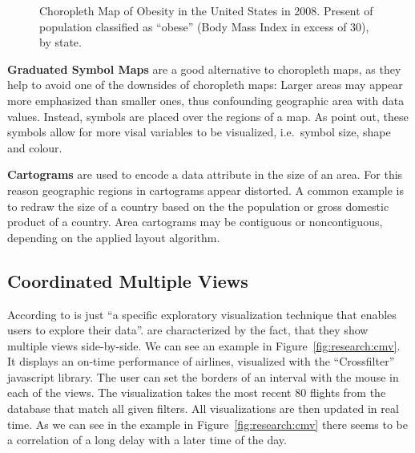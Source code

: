 \begin{figure}[ht]
  \centering
  \caption{%
    Choropleth Map of Obesity in the United States in 2008.
    Present of population classified as ``obese'' (Body Mass Index in excess of 30), by state.
  }\label{fig:related-work:choropleth}
\end{figure}

\textbf{Graduated Symbol Maps} are a good alternative to choropleth maps, as they help to avoid one of the downsides of choropleth maps:
Larger areas may appear more emphasized than smaller ones, thus confounding geographic area with data values.
Instead, symbols are placed over the regions of a map.
As \textcite{Heer2010} point out, these symbols allow for more visal variables to be visualized, i.e.\  symbol size, shape and colour.

\textbf{Cartograms} are used to encode a data attribute in the size of an area.
For this reason geographic regions in cartograms appear distorted.
A common example is to redraw the size of a country based on the the population or gross domestic product of a country.
Area cartograms may be contiguous or noncontiguous, depending on the applied layout algorithm.

\subsection{Coordinated Multiple Views}
According to \textcite{Roberts2007} \cmvs{} is just ``a specific exploratory visualization technique that enables users to explore their data''.
\cmvs{} are characterized by the fact, that they show multiple views side-by-side.
We can see an example in Figure~\ref{fig:research:cmv}.
It displays an on-time performance of airlines, visualized with the ``Crossfilter'' javascript library.
The user can set the borders of an interval with the mouse in each of the views.
The visualization takes the most recent 80 flights from the database that match all given filters.
All visualizations are then updated in real time.
As we can see in the example in Figure~\ref{fig:research:cmv} there seems to be a correlation of a long delay with a later time of the day.

